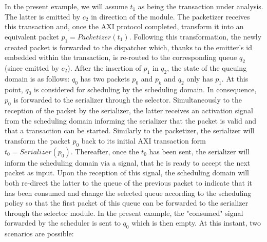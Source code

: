             In the present example, we will assume $t_{1}$ as being the
            transaction under analysis.  The latter is emitted by $c_{2}$ in
            direction of the \schim module.  The packetizer receives this
            transaction and, once the AXI protocol completed, transform it into an
            equivalent packet $p_{1} = Packetizer(t_{1})$.  Following this
            transformation, the newly created packet is forwarded to the
            dispatcher which, thanks to the emitter's id embedded within the
            transaction, is re-routed to the corresponding queue $q_{2}$ (since
            emitted by $c_{2}$).  After the insertion of $p_{1}$ in $q_{2}$, the
            state of the queuing domain is as follows: $q_{0}$ has two packets
            $p_{0}$ and $p_{k}$ and $q_{2}$ only has $p_{1}$.  At this point,
            $q_{0}$ is considered for scheduling by the scheduling domain.  In
            consequence, $p_{0}$ is forwarded to the serializer through the
            selector.  Simultaneously to the reception of the packet by the
            serializer, the latter receives an activation signal from the
            scheduling domain informing the serializer that the packet is valid
            and that a transaction can be started.  Similarly to the packetizer,
            the serializer will transform the packet $p_{0}$ back to its initial
            AXI transaction form $t_{0} = Serializer(p_{0})$.  Thereafter, once
            the $t_{0}$ has been sent, the serializer will inform the scheduling
            domain via a signal, that he is ready to accept the next packet as
            input.  Upon the reception of this signal, the scheduling domain will
            both re-direct the latter to the queue of the previous packet to
            indicate that it has been consumed and change the selected queue
            according to the scheduling policy so that the first packet of this
            queue can be forwarded to the serializer through the selector module.
            In the present example, the "consumed" signal forwarded by the
            scheduler is sent to $q_{0}$ which is then empty.  At this instant,
            two scenarios are possible:

